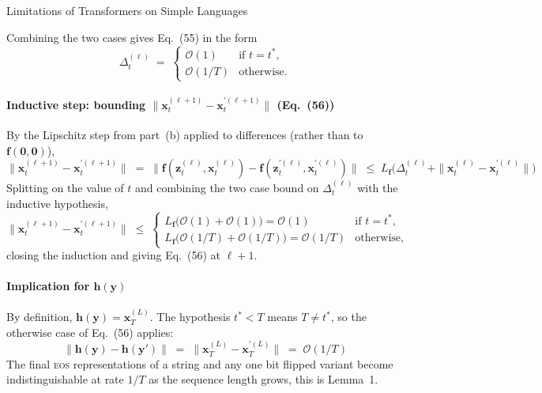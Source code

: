\begin{question}{Limitations of Transformers on Simple Languages}
\begin{subquestion}
    Combining the two cases gives Eq.~(55) in the form
    \begin{equation*}
        \Delta_t^{(\ell)} \;=\;
        \begin{cases} \mathcal{O}(1) & \text{if } t = t^*, \\ \mathcal{O}(1/T) & \text{otherwise.} \end{cases}
    \end{equation*}

    \paragraph{Inductive step: bounding $\|\mathbf{x}_t^{(\ell+1)} - \mathbf{x}_t^{\prime(\ell+1)}\|$ (Eq.~(56))}
    By the Lipschitz step from part~(b) applied to differences (rather than to $\mathbf{f}(\mathbf{0},\mathbf{0})$),
    \begin{equation*}
        \|\mathbf{x}_t^{(\ell+1)} - \mathbf{x}_t^{\prime(\ell+1)}\|
        \;=\; \|\mathbf{f}(\mathbf{z}_t^{(\ell)}, \mathbf{x}_t^{(\ell)}) - \mathbf{f}(\mathbf{z}_t^{\prime(\ell)}, \mathbf{x}_t^{\prime(\ell)})\|
        \;\le\; L_{\mathbf{f}}\bigl(\Delta_t^{(\ell)} + \|\mathbf{x}_t^{(\ell)} - \mathbf{x}_t^{\prime(\ell)}\|\bigr)
    \end{equation*}
    Splitting on the value of $t$ and combining the two case bound on $\Delta_t^{(\ell)}$ with the inductive hypothesis,
    \begin{equation*}
        \|\mathbf{x}_t^{(\ell+1)} - \mathbf{x}_t^{\prime(\ell+1)}\|
        \;\le\;
        \begin{cases} L_{\mathbf{f}}\bigl(\mathcal{O}(1) + \mathcal{O}(1)\bigr) = \mathcal{O}(1) & \text{if } t = t^*, \\ L_{\mathbf{f}}\bigl(\mathcal{O}(1/T) + \mathcal{O}(1/T)\bigr) = \mathcal{O}(1/T) & \text{otherwise,} \end{cases}
    \end{equation*}
    closing the induction and giving Eq.~(56) at $\ell+1$.

    \paragraph{Implication for $\mathbf{h}(\mathbf{y})$}
    By definition, $\mathbf{h}(\mathbf{y}) = \mathbf{x}_T^{(L)}$. The hypothesis $t^* < T$ means $T \ne t^*$, so the otherwise case of Eq.~(56) applies:
    \begin{equation*}
        \|\mathbf{h}(\mathbf{y}) - \mathbf{h}(\mathbf{y}')\| \;=\; \|\mathbf{x}_T^{(L)} - \mathbf{x}_T^{\prime(L)}\| \;=\; \mathcal{O}(1/T)
    \end{equation*}
    The final \textsc{eos} representations of a string and any one bit flipped variant become indistinguishable at rate $1/T$ as the sequence length grows, this is Lemma~1.
\end{subquestion}


\end{question}
